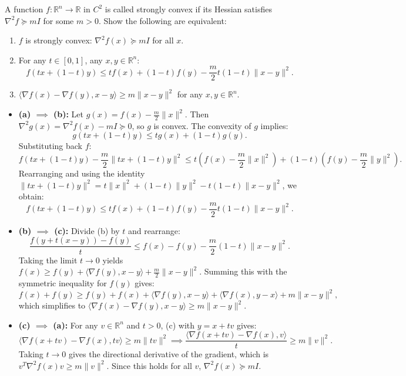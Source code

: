 \begin{exercise}
\label{applied:2016:5}
A function $f:\mathbb{R}^{n}\to\mathbb{R}$ in $C^{2}$ is called strongly convex if its Hessian satisfies $\nabla^{2}f\succeq mI$ for some $m>0$. Show the following are equivalent:

\begin{enumerate}
\item[(a)] $f$ is strongly convex: $\nabla^{2}f(x)\succeq mI$ for all $x$.
\item[(b)] For any $t\in[0,1]$, any $x,y\in\mathbb{R}^{n}$:
\[
f(tx+(1-t)y)\leq tf(x)+(1-t)f(y)-\frac{m}{2}t(1-t)\|x-y\|^{2}.
\]
\item[(c)] $\langle\nabla f(x)-\nabla f(y),x-y\rangle\geq m\|x-y\|^{2}$ for any $x,y\in\mathbb{R}^{n}$.
\end{enumerate}
\end{exercise}

\begin{solution}
\begin{itemize}
    \item \textbf{(a) $\implies$ (b):} Let $g(x) = f(x) - \frac{m}{2}\|x\|^2$. Then $\nabla^2 g(x) = \nabla^2 f(x) - mI \succeq 0$, so $g$ is convex. The convexity of $g$ implies:
    \[ g(tx + (1-t)y) \leq tg(x) + (1-t)g(y). \]
    Substituting back $f$:
    \[ f(tx+(1-t)y) - \frac{m}{2}\|tx+(1-t)y\|^2 \leq t\left(f(x) - \frac{m}{2}\|x\|^2\right) + (1-t)\left(f(y) - \frac{m}{2}\|y\|^2\right). \]
    Rearranging and using the identity $\|tx+(1-t)y\|^2 = t\|x\|^2 + (1-t)\|y\|^2 - t(1-t)\|x-y\|^2$, we obtain:
    \[ f(tx+(1-t)y) \leq tf(x) + (1-t)f(y) - \frac{m}{2}t(1-t)\|x-y\|^2. \]

    \item \textbf{(b) $\implies$ (c):} Divide (b) by $t$ and rearrange:
    \[ \frac{f(y+t(x-y)) - f(y)}{t} \leq f(x) - f(y) - \frac{m}{2}(1-t)\|x-y\|^2. \]
    Taking the limit $t \to 0$ yields $f(x) \geq f(y) + \langle \nabla f(y), x-y \rangle + \frac{m}{2}\|x-y\|^2$. Summing this with the symmetric inequality for $f(y)$ gives:
    \[ f(x) + f(y) \geq f(y) + f(x) + \langle \nabla f(y), x-y \rangle + \langle \nabla f(x), y-x \rangle + m\|x-y\|^2, \]
    which simplifies to $\langle \nabla f(x) - \nabla f(y), x-y \rangle \geq m\|x-y\|^2$.

    \item \textbf{(c) $\implies$ (a):} For any $v \in \mathbb{R}^n$ and $t > 0$, (c) with $y = x+tv$ gives:
    \[ \langle \nabla f(x+tv) - \nabla f(x), tv \rangle \geq m\|tv\|^2 \implies \frac{\langle \nabla f(x+tv) - \nabla f(x), v \rangle}{t} \geq m\|v\|^2. \]
    Taking $t \to 0$ gives the directional derivative of the gradient, which is $v^T \nabla^2 f(x) v \geq m\|v\|^2$. Since this holds for all $v$, $\nabla^2 f(x) \succeq mI$.
\end{itemize}
\end{solution}


